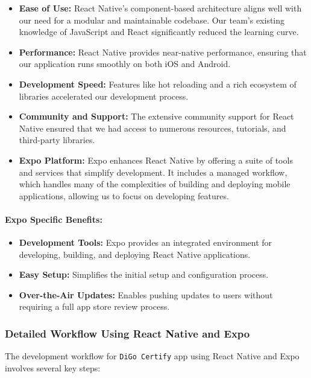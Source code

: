 \begin{itemize}
    \item \textbf{Ease of Use:} React Native's component-based architecture aligns well with our need for a modular and maintainable codebase. Our team’s existing knowledge of JavaScript and React significantly reduced the learning curve.
    \item \textbf{Performance:} React Native provides near-native performance, ensuring that our application runs smoothly on both iOS and Android.
    \item \textbf{Development Speed:} Features like hot reloading and a rich ecosystem of libraries accelerated our development process.
    \item \textbf{Community and Support:} The extensive community support for React Native ensured that we had access to numerous resources, tutorials, and third-party libraries.
    \item \textbf{Expo Platform:} Expo enhances React Native by offering a suite of tools and services that simplify development. It includes a managed workflow, which handles many of the complexities of building and deploying mobile applications, allowing us to focus on developing features.
\end{itemize}

\paragraph{Expo Specific Benefits:}

\begin{itemize}
    \item \textbf{Development Tools:} Expo provides an integrated environment for developing, building, and deploying React Native applications.
    \item \textbf{Easy Setup:} Simplifies the initial setup and configuration process.
    \item \textbf{Over-the-Air Updates:} Enables pushing updates to users without requiring a full app store review process.
\end{itemize}

\subsubsection{Detailed Workflow Using React Native and Expo}

The development workflow for \texttt{DiGo Certify} app using React Native and Expo involves several key steps:

